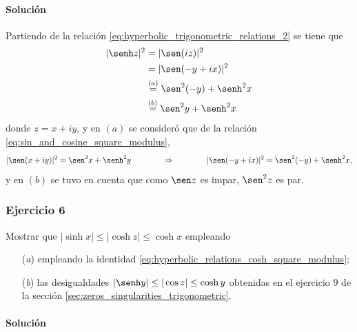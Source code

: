 \documentclass[a4paper]{report}
\begin{document}
\paragraph{Solución} Partiendo de la relación \ref{eq:hyperbolic_trigonometric_relations_2} se tiene que 
\begin{align*}
 |\senh z|^2&=|\sen(iz)|^2\\
   &=|\sen(-y+ix)|^2\\
   &\overset{(a)}{=}\sen^2(-y)+\senh^2x\\
   &\overset{(b)}{=}\sen^2 y+\senh^2x
\end{align*}
donde \(z=x+iy\), y en \((a)\) se consideró que de la relación \ref{eq:sin_and_cosine_square_modulus},
\[
 |\sen(x+iy)|^2=\sen^2x+\senh^2y
 \qquad\qquad\Rightarrow\qquad\qquad
 |\sen(-y+ix)|^2=\sen^2(-y)+\senh^2x,
\]
y en \((b)\) se tuvo en cuenta que como \(\sen z\) es impar, \(\sen^2 z\) es par.

\subsubsection{Ejercicio 6}

Mostrar que \(|\sinh x|\leq|\cosh z|\leq\cosh x\) empleando
\begin{enumerate}
 \item[(\textit{a})] empleando la identidad \ref{eq:hyperbolic_relations_cosh_square_modulus};
 \item[(\textit{b})] las desigualdades \(|\senh y|\leq|\cos z|\leq\cosh y\) obtenidas en el ejercicio 9 de la sección \ref{sec:zeros_singularities_trigonometric}.
\end{enumerate}

\paragraph{Solución} 
\end{document}
